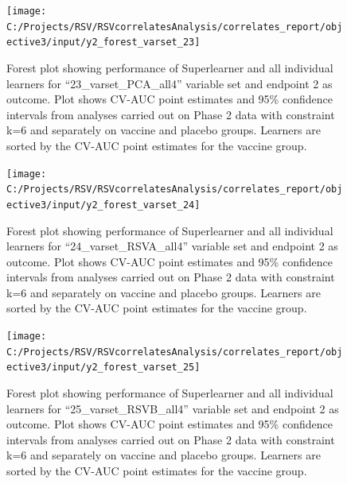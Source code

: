 \documentclass[11pt]{article}
\begin{document}
\begin{figure}[H]

{\centering \texttt{[image: C:/Projects/RSV/RSVcorrelatesAnalysis/correlates\_report/objective3/input/y2\_forest\_varset\_23]} 

}

\caption[Forest plot for ``23\_varset\_PCA\_all4'' variable set, endpoint 2.]{Forest plot showing performance of Superlearner and all individual learners for ``23\_varset\_PCA\_all4'' variable set and endpoint 2 as outcome. Plot shows CV-AUC point estimates and 95\% confidence intervals from analyses carried out on Phase 2 data with constraint k=6 and separately on vaccine and placebo groups. Learners are sorted by the CV-AUC point estimates for the vaccine group.}\label{fig:y2-forest-varset-23}
\end{figure}

\begin{figure}[H]

{\centering \texttt{[image: C:/Projects/RSV/RSVcorrelatesAnalysis/correlates\_report/objective3/input/y2\_forest\_varset\_24]} 

}

\caption[Forest plot for ``24\_varset\_RSVA\_all4'' variable set, endpoint 2.]{Forest plot showing performance of Superlearner and all individual learners for ``24\_varset\_RSVA\_all4'' variable set and endpoint 2 as outcome. Plot shows CV-AUC point estimates and 95\% confidence intervals from analyses carried out on Phase 2 data with constraint k=6 and separately on vaccine and placebo groups. Learners are sorted by the CV-AUC point estimates for the vaccine group.}\label{fig:y2-forest-varset-24}
\end{figure}

\begin{figure}[H]

{\centering \texttt{[image: C:/Projects/RSV/RSVcorrelatesAnalysis/correlates\_report/objective3/input/y2\_forest\_varset\_25]} 

}

\caption[Forest plot for ``25\_varset\_RSVB\_all4'' variable set, endpoint 2.]{Forest plot showing performance of Superlearner and all individual learners for ``25\_varset\_RSVB\_all4'' variable set and endpoint 2 as outcome. Plot shows CV-AUC point estimates and 95\% confidence intervals from analyses carried out on Phase 2 data with constraint k=6 and separately on vaccine and placebo groups. Learners are sorted by the CV-AUC point estimates for the vaccine group.}\label{fig:y2-forest-varset-25}
\end{figure}
\end{document}
